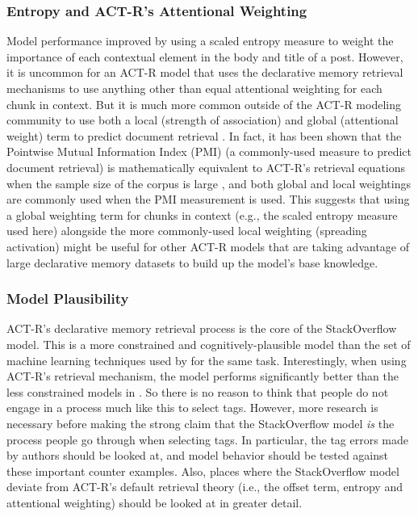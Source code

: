 \documentclass[10pt,letterpaper]{article}
\begin{document}
\subsubsection{Entropy and ACT-R's Attentional Weighting}

Model performance improved by using a scaled entropy measure to weight the importance of each contextual element in the body and title of a post.
However, it is uncommon for an ACT-R model that uses the declarative memory retrieval mechanisms to use anything other than equal attentional weighting for each chunk in context.
But it is much more common outside of the ACT-R modeling community to use both a local (strength of association) and global (attentional weight) term to predict document retrieval \cite{Dumais1991}.
In fact, it has been shown that the Pointwise Mutual Information Index (PMI) (a commonly-used measure to predict document retrieval)
is mathematically equivalent to ACT-R's retrieval equations when the sample size of the corpus is large \cite{Budiu2007, Farahat2004},
and both global and local weightings are commonly used when the PMI measurement is used.
This suggests that using a global weighting term for chunks in context (e.g., the scaled entropy measure used here)
alongside the more commonly-used local weighting (spreading activation) might be useful for other ACT-R models that are taking advantage of large declarative memory datasets to build up the model's base knowledge.

\subsubsection{Model Plausibility}

ACT-R's declarative memory retrieval process is the core of the StackOverflow model.
This is a more constrained and cognitively-plausible model than the set of machine learning techniques used by  for the same task. 
Interestingly, when using ACT-R's retrieval mechanism, the model performs significantly better than the less constrained models in .
So there is no reason to think that people do not engage in a process much like this to select tags.
However, more research is necessary before making the strong claim that the StackOverflow model \emph{is} the process people go through when selecting tags.
In particular, the tag errors made by authors should be looked at, and model behavior should be tested against these important counter examples.
Also, places where the StackOverflow model deviate from ACT-R's default retrieval theory (i.e., the offset term, entropy and attentional weighting) should be looked at in greater detail.
\end{document}
